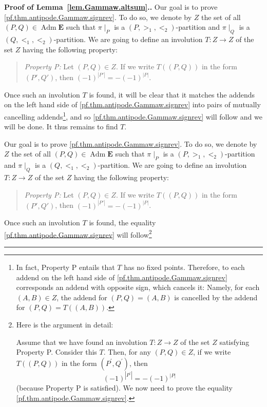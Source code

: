 \documentclass[numbers=enddot,12pt,final,onecolumn,notitlepage,abstracton]{scrartcl}
\theoremstyle{definition}
\newenvironment{statement}{\begin{quote}}{\end{quote}}
\newenvironment{proof}[1][Proof]{\noindent\textbf{#1.} }{\ \rule{0.5em}{0.5em}}
\newenvironment{verlong}{}{}
\newenvironment{vershort}{}{}
\newcommand{\Adm}{\operatorname{Adm}}
\newcommand{\EE}{{\mathbf{E}}}
\begin{document}
\begin{proof}[Proof of Lemma~\ref{lem.Gammaw.altsum}.]
\begin{vershort}
Our goal is to prove \eqref{pf.thm.antipode.Gammaw.signrev}.
To do so, we denote by $Z$ the set of all
$\left(P, Q\right) \in \Adm \EE$ such that
$\pi\mid_P$ is a $\left(P, >_1, <_2\right)$-partition and
$\pi\mid_Q$ is a $\left(Q, <_1, <_2\right)$-partition. We are going
to define an involution $T : Z \to Z$ of the set $Z$ having the
following property:
\begin{statement}
\textit{Property P:} Let $\left(P, Q\right) \in Z$. If we write
$T\left(\left(P, Q\right)\right)$ in the form
$\left(P', Q'\right)$, then
$\left(-1\right)^{\left|P'\right|}
= - \left(-1\right)^{\left|P\right|}$.
\end{statement}
Once such an involution $T$
is found, it will be clear that it matches the addends on the left
hand side of \eqref{pf.thm.antipode.Gammaw.signrev} into pairs of
mutually cancelling addends\footnote{In fact, Property P
entails that $T$ has no fixed points. Therefore, to each addend
on the left
hand side of \eqref{pf.thm.antipode.Gammaw.signrev} corresponds an
addend with opposite sign, which cancels it: Namely, for each
$\left(A, B\right) \in Z$, the addend for
$\left(P, Q\right) = \left(A, B\right)$ is cancelled by the addend
for $\left(P, Q\right) = T\left(\left(A, B\right)\right)$.}, and so
\eqref{pf.thm.antipode.Gammaw.signrev}
will follow and we will be done. It thus remains to find $T$.
\end{vershort}

\begin{verlong}
Our goal is to prove \eqref{pf.thm.antipode.Gammaw.signrev}.
To do so, we denote by $Z$ the set of all
$\left(P, Q\right) \in \Adm \EE$ such that
$\pi\mid_P$ is a $\left(P, >_1, <_2\right)$-partition and
$\pi\mid_Q$ is a $\left(Q, <_1, <_2\right)$-partition. We are going
to define an involution $T : Z \to Z$ of the set $Z$ having the
following property:
\begin{statement}
\textit{Property P:} Let $\left(P, Q\right) \in Z$. If we write
$T\left(\left(P, Q\right)\right)$ in the form
$\left(P', Q'\right)$, then
$\left(-1\right)^{\left|P'\right|}
= - \left(-1\right)^{\left|P\right|}$.
\end{statement}
Once such an involution $T$
is found, the equality \eqref{pf.thm.antipode.Gammaw.signrev} will
follow\footnote{Here is the argument in detail:

Assume that we have found an involution $T:Z\rightarrow Z$ of the set $Z$
satisfying Property P. Consider this $T$. Then,
for any $\left(  P,Q\right)  \in Z$, if we write
$T\left(  \left(  P,Q\right)  \right)  $ in the form $\left(  P^{\prime
},Q^{\prime}\right)  $, then
\begin{equation}
\left(  -1\right)  ^{\left\vert P^{\prime}\right\vert }=-\left(  -1\right)
^{\left\vert P\right\vert }
\label{pf.thm.antipode.Gammaw.signrev.final.1}
\end{equation}
(because Property P is satisfied).
We now need to prove the equality \eqref{pf.thm.antipode.Gammaw.signrev}.

}
\end{verlong}
\end{proof}
\end{document}
